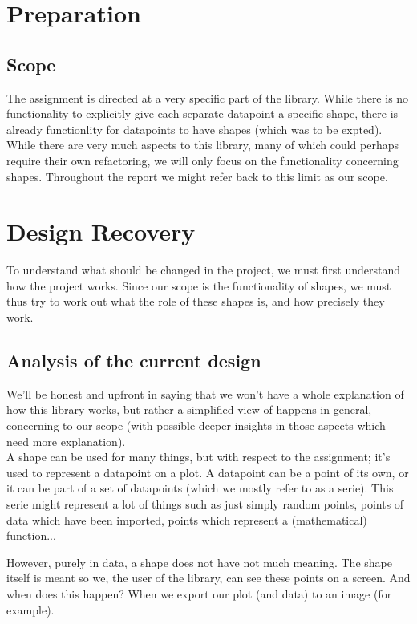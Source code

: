 \documentclass{article}
\begin{document}
\section{Preparation}

\subsection{Scope}

The assignment is directed at a very specific part of the library. While there is no functionality to explicitly give each separate datapoint a specific shape, there is already functionlity for datapoints to have shapes (which was to be expted). While there are very much aspects to this library, many of which could perhaps require their own refactoring, we will only focus on the functionality concerning shapes. Throughout the report we might refer back to this limit as our scope.

\section{Design Recovery}

To understand what should be changed in the project, we must first understand how the project works. Since our scope is the functionality of shapes, we must thus try to work out what the role of these shapes is, and how precisely they work.

\subsection{Analysis of the current design}

We'll be honest and upfront in saying that we won't have a whole explanation of how this library works, but rather a simplified view of happens in general, concerning to our scope (with possible deeper insights in those aspects which need more explanation).\\

A shape can be used for many things, but with respect to the assignment; it's used to represent a datapoint on a plot. A datapoint can be a point of its own, or it can be part of a set of datapoints (which we mostly refer to as a serie). This serie might represent a lot of things such as just simply random points, points of data which have been imported, points which represent a (mathematical) function... 

However, purely in data, a shape does not have not much meaning. The shape itself is meant so we, the user of the library, can see these points on a screen. And when does this happen? When we export our plot (and data) to an image (for example).\\
\end{document}
